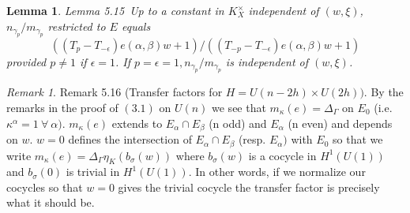 \documentclass{memo-l}
\newtheorem{lemma}[theorem]{Lemma}
\theoremstyle{definition}
\theoremstyle{remark}
\newtheorem{remark}[theorem]{Remark}
\numberwithin{section}{chapter}
\numberwithin{equation}{chapter}
\begin{document}
\medpagebreak

\begin{lemma}{Lemma 5.15}\ Up to a constant in $K_X^{\times}$ independent of
$(w,{\xi})$, $ n_{{\gamma_p}} /m_{{\gamma_p}}$ restricted to $E$ equals
$$
((T_{p}-T_{-{\epsilon}})e({\alpha},{\beta})w+1)/((T_{-p}-T_{-{\epsilon}})e({\alpha},{\beta})w+1)
$$
provided $p \ne  1$ if ${\epsilon}  =  1$.  If $p = {\epsilon} = 1,  
n_{{\gamma_p}}/m_{{\gamma_p}}$ is independent of $(w,{\xi})$.
\end{lemma}

\begin{remark}{Remark  5.16} (Transfer factors for $H  =  U(n-2h) \times U(2h))$.  By
the remarks in the proof of $(3.1)$ on $U(n)$ we see that
$m_{{\kappa}}(e) = {\Delta}_{{\Gamma}}$ on $E_{0}$ (i.e.
${\kappa}^{{\alpha}}  =  1 {\ \forall\ } {\alpha})$.  $m_{{\kappa}}(e)$
extends to $E_{{\alpha}} {\cap} E_{{\beta}}$ (n odd) and $E_{{\alpha}}$ (n
even) and depends on $w$.  $w = 0$ defines the intersection of $E_{{\alpha}}
{\cap} E_{{\beta}}$ (resp.  $E_{{\alpha}})$ with $E_{0}$ so that we write
$m_{{\kappa}}(e) = {\Delta}_{{\Gamma}}{\eta}_{K}(b_{{\sigma}}(w))$ where
$b_{{\sigma}}(w)$ is a cocycle in $H^{1}(U(1))$ and $b_{{\sigma}}(0)$ is
trivial in $H^{1}(U(1))$.  In other words, if we normalize our cocycles so
that $w = 0$ gives the trivial cocycle the transfer factor is precisely what
it should be.
\end{remark}
 
\end{document}
